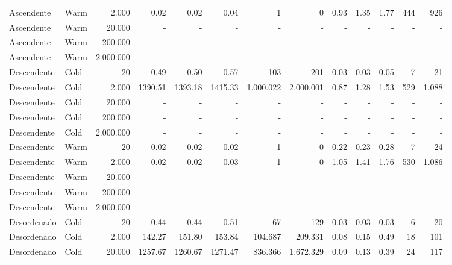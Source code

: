 \documentclass[12pt,a4paper]{article}
\begin{document}
\begin{table}[H]
{\begin{tabular}{llr rrr rr rrr rr}
Ascendente  & Warm & 2.000                         &    0.02 &    0.02 &    0.04 &     1 &     0 &    0.93 &    1.35 &    1.77 &   444 &   926 \\
Ascendente  & Warm & 20.000    &  - & - & - & - & - & - & - & - & - & - \\ %
Ascendente  & Warm & 200.000   &  - & - & - & - & - & - & - & - & - & - \\ %
Ascendente  & Warm & 2.000.000 &  - & - & - & - & - & - & - & - & - & - \\ %
\midrule
Descendente & Cold & 20                                        &    0.49 &    0.50 &    0.57 &   103 &   201 &    0.03 &    0.03 &    0.05 &     7 &    21 \\
Descendente & Cold & 2.000                         & 1390.51 & 1393.18 & 1415.33 & 1.000.022 & 2.000.001 &    0.87 &    1.28 &    1.53 &   529 & 1.088 \\
Descendente & Cold & 20.000    &  - & - & - & - & - & - & - & - & - & - \\ %
Descendente & Cold & 200.000   &  - & - & - & - & - & - & - & - & - & - \\ %
Descendente & Cold & 2.000.000 &  - & - & - & - & - & - & - & - & - & - \\ %
\midrule
Descendente & Warm & 20                                        &    0.02 &    0.02 &    0.02 &     1 &     0 &    0.22 &    0.23 &    0.28 &     7 &    24 \\
Descendente & Warm & 2.000                         &    0.02 &    0.02 &    0.03 &     1 &     0 &    1.05 &    1.41 &    1.76 &   530 & 1.086 \\
Descendente & Warm & 20.000    &  - & - & - & - & - & - & - & - & - & - \\ %
Descendente & Warm & 200.000   &  - & - & - & - & - & - & - & - & - & - \\ %
Descendente & Warm & 2.000.000 &  - & - & - & - & - & - & - & - & - & - \\ %
\midrule
Desordenado & Cold & 20                                        &    0.44 &    0.44 &    0.51 &    67 &   129 &    0.03 &    0.03 &    0.03 &     6 &    20 \\
Desordenado & Cold & 2.000                         &  142.27 &  151.80 &  153.84 & 104.687 & 209.331 &    0.08 &    0.15 &    0.49 &    18 &   101 \\
Desordenado & Cold & 20.000                    & 1257.67 & 1260.67 & 1271.47 & 836.366 & 1.672.329 &    0.09 &    0.13 &    0.39 &    24 &   117 \\

\end{tabular}}
\end{table}
\end{document}
